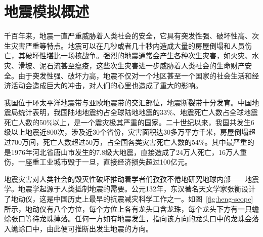 
\section{地震模拟概述}



千百年来，地震一直严重威胁着人类社会的安全，它具有突发性强、破坏性高、次生灾害严重等特点。地震可以在几秒或者几十秒内造成大量的房屋倒塌和人员伤亡，其破坏性堪比一场核战争。强烈的地震通常会产生各种次生灾害，如火灾、水灾、滑坡、泥石流甚至瘟疫，这些次生灾害进一步威胁着人类社会的生命财产安全。由于突发性强、破坏力高，地震不仅对一个地区甚至一个国家的社会生活和经济活动会造成巨大的冲击，对人们的心里也造成了重大的影响。

我国位于环太平洋地震带与亚欧地震带的交汇部位，地震断裂带十分发育。中国地震局统计表明，我国陆地地震约占全球陆地地震的33\%、地震死亡人数占全球地震死亡人数的50\%以上，是一个震灾极其严重的国家\cite{地震局}。二十世纪以来，我国共发生6级以上地震近800次，涉及近30个省份，灾害面积达30多万平方千米，房屋倒塌超过700万间，死亡人数超过50万，占全国各类灾害死亡人数的54\%。其中最严重的是1976年河北省唐山市发生的7.8级大地震，直接造成了24万人死亡，16万人重伤，一座重工业城市毁于一旦，直接经济损失超过100亿元\cite{地震局}。

地震灾害对人类社会的毁灭性破坏推动着学者们孜孜不倦地研究地球内部——地震学。地震学起源于人类抵制地震的需要。公元132年，东汉著名天文学家张衡设计了地动仪，这是中国历史上最早的抗震减灾科学工作之一\citep{stein2009introduction}。如图~\ref{fig:heng-scope}所示，地动仪有八个方位，每个方位上各有龙头口含龙珠，每个龙头下方有一只蟾蜍张口等待龙珠掉落。任何一方如有地震发生，指向该方向的龙头口中的龙珠会落入蟾蜍口中，由此便可推断出发生地震的方向\cite{seismoscopewiki}。

